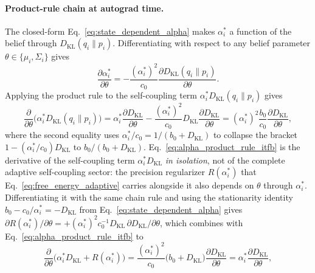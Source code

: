 \documentclass[11pt]{article}
\begin{document}
\paragraph{Product-rule chain at autograd time.}
The closed-form Eq.~\eqref{eq:state_dependent_alpha} makes $\alpha_i^*$ a function of the belief through $D_{\mathrm{KL}}(q_i \| p_i)$. Differentiating with respect to any belief parameter $\theta \in \{\mu_i, \Sigma_i\}$ gives
\begin{equation}
\frac{\partial \alpha_i^*}{\partial \theta} = -\frac{(\alpha_i^*)^2}{c_0} \frac{\partial D_{\mathrm{KL}}(q_i \| p_i)}{\partial \theta}.
\label{eq:alpha_chain_rule_itfb}
\end{equation}
Applying the product rule to the self-coupling term $\alpha_i^* D_{\mathrm{KL}}(q_i \| p_i)$ gives
\begin{equation}
\frac{\partial}{\partial \theta}\bigl(\alpha_i^* D_{\mathrm{KL}}(q_i \| p_i)\bigr) = \alpha_i^* \frac{\partial D_{\mathrm{KL}}}{\partial \theta} - \frac{(\alpha_i^*)^2}{c_0} D_{\mathrm{KL}} \frac{\partial D_{\mathrm{KL}}}{\partial \theta} = (\alpha_i^*)^2 \frac{b_0}{c_0} \frac{\partial D_{\mathrm{KL}}}{\partial \theta},
\label{eq:alpha_product_rule_itfb}
\end{equation}
where the second equality uses $\alpha_i^*/c_0 = 1/(b_0 + D_{\mathrm{KL}})$ to collapse the bracket $1 - (\alpha_i^*/c_0) D_{\mathrm{KL}}$ to $b_0/(b_0 + D_{\mathrm{KL}})$. Eq.~\eqref{eq:alpha_product_rule_itfb} is the derivative of the self-coupling term $\alpha_i^* D_{\mathrm{KL}}$ \emph{in isolation}, not of the complete adaptive self-coupling sector: the precision regularizer $R(\alpha_i^*)$ that Eq.~\eqref{eq:free_energy_adaptive} carries alongside it also depends on $\theta$ through $\alpha_i^*$. Differentiating it with the same chain rule and using the stationarity identity $b_0 - c_0/\alpha_i^* = -D_{\mathrm{KL}}$ from Eq.~\eqref{eq:state_dependent_alpha} gives $\partial R(\alpha_i^*)/\partial\theta = +(\alpha_i^*)^2 c_0^{-1} D_{\mathrm{KL}}\,\partial D_{\mathrm{KL}}/\partial\theta$, which combines with Eq.~\eqref{eq:alpha_product_rule_itfb} to
\begin{equation}
\frac{\partial}{\partial\theta}\bigl(\alpha_i^* D_{\mathrm{KL}} + R(\alpha_i^*)\bigr) = \frac{(\alpha_i^*)^2}{c_0}\bigl(b_0 + D_{\mathrm{KL}}\bigr)\frac{\partial D_{\mathrm{KL}}}{\partial\theta} = \alpha_i^*\frac{\partial D_{\mathrm{KL}}}{\partial\theta},
\label{eq:alpha_envelope_cancel_itfb}
\end{equation}
\end{document}
